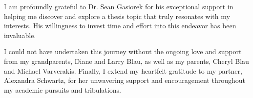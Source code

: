 I am profoundly grateful to Dr. Sean Gasiorek for his exceptional support in helping me discover and explore a thesis topic that truly resonates with my interests. His willingness to invest time and effort into this endeavor has been invaluable.

I could not have undertaken this journey without the ongoing love and support from my grandparents, Diane and Larry Blau, as well as my parents, Cheryl Blau and Michael Varverakis. Finally, I extend my heartfelt gratitude to my partner, Alexandra Schwartz, for her unwavering support and encouragement throughout my academic pursuits and tribulations.